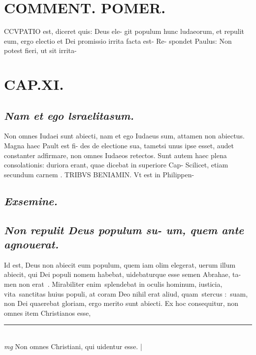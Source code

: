 \documentclass{article}
\begin{document}
\begin{pages}
\section*{COMMENT. POMER.  }\pstart CCVPATIO est, diceret quis: Deus ele-  git populum hunc ludaeorum, et repulit eum, ergo electio et Dei promissio irrita facta est- Re- spondet Paulus: Non potest fieri, ut sit irrita-  \pend
\endnumbering\beginnumbering\section{CAP.XI.}
{}
\subsection*{\textit{Nam et ego lsraelitasum. }}\pstart Non omnes Iudaei sunt abiecti, nam et ego Iudaeus sum, attamen non abiectus. Magna haec Pault est fi- des de electione sua, tametsi unus ipse esset, audet constanter adfirmare, non omnes Iudaeos retectos. Sunt autem haec plena consolationis: duriora erant, quae dicebat in superiore Cap-  \pend\pstart Scilicet, etiam secundum carnem . TRIBVS BENIAMIN. Vt est in Philippen-  \pend
{}
{}
\subsection*{\textit{Exsemine. }}
{}
\subsection*{\textit{Non repulit Deus populum su- um, quem ante agnouerat. }}\pstart Id est, Deus non abiecit eum populum, quem iam olim elegerat, uerum illum abiecit, qui Dei populi nomem habebat, uidebaturque esse semen Abrahae, ta- men non erat . Mirabiliter enim splendebat in oculis hominum, iusticia, vita sanctitas huius populi, at coram Deo nihil erat aliud, quam stercus : suam, non Dei quaerebat gloriam, ergo merito sunt abiecti. Ex hoc consequitur, non omnes item Christianos esse,  \pend
\vspace{0.5cm}\noindent
\vspace{0.2cm}\rule{1cm}{0.2pt}\\ 
\hspace{0.2cm}\textit{mg}
\footnotesize Non omnes Christiani, qui uidentur esse.  
\normalsize| 

\end{pages}
\end{document}
